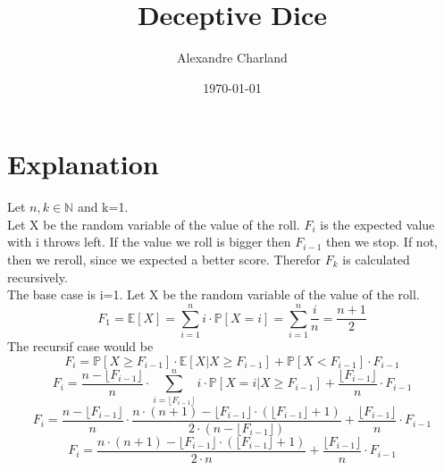 \documentclass{article}
\title{Deceptive Dice}
\author{Alexandre Charland}
\date{\today}
\begin{document}
\maketitle

\section{Explanation}
Let $n,k \in \mathbb{N}$ and k=1.\\
Let X be the random variable of the value of the roll. $F_{i}$ is the expected value with i throws left. If the value we roll is bigger then $F_{i-1}$ then we stop. If not, then we reroll, since we expected a better score. Therefor $F_k$ is calculated recursively.\\
The base case is i=1. Let X be the random variable of the value of the roll.
\[ F_{1} = \mathbb{E}[X]=\sum_{i=1}^{n} i \cdot \mathbb{P}[X=i] = \sum_{i=1}^{n} \frac{i}{n} = \frac{n+1}{2} \]
The recursif case would be
\[ F_{i} = \mathbb{P}[X \geq F_{i-1}] \cdot \mathbb{E}[X | X \geq F_{i-1}] + \mathbb{P}[X < F_{i-1}] \cdot F_{i-1}  \]
\[ F_{i} = \frac{n - \lfloor F_{i-1} \rfloor}{n} \cdot \sum_{i=\lfloor F_{i-1} \rfloor}^{n} i \cdot \mathbb{P}[X=i | X \geq F_{i-1}] + \frac{\lfloor F_{i-1} \rfloor}{n} \cdot F_{i-1} \]
\[ F_{i} = \frac{n - \lfloor F_{i-1} \rfloor}{n} \cdot \frac{n\cdot (n+1) - \lfloor F_{i-1} \rfloor \cdot (\lfloor F_{i-1} \rfloor +1)}{2 \cdot (n - \lfloor F_{i-1} \rfloor)} + \frac{\lfloor F_{i-1} \rfloor}{n} \cdot F_{i-1} \]
\[ F_{i} = \frac{n\cdot (n+1) - \lfloor F_{i-1} \rfloor \cdot (\lfloor F_{i-1} \rfloor +1)}{2 \cdot n} + \frac{\lfloor F_{i-1} \rfloor}{n} \cdot F_{i-1} \]
\end{document}
